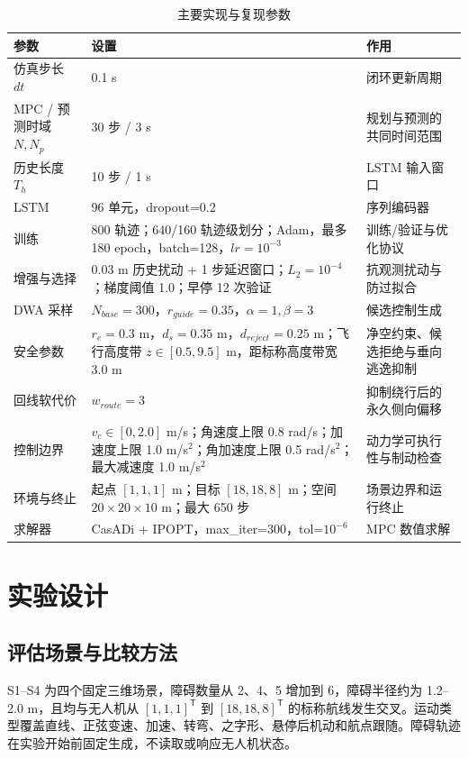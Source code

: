 \documentclass[11pt,a4paper]{ctexart}
\begin{document}
\begin{table}[t]
\centering
\small
\caption{主要实现与复现参数}
\label{tab:table-1}
\begin{tabularx}{\linewidth}{YYY}
\toprule
参数 & 设置 & 作用 \\
\midrule
仿真步长 $dt$ & 0.1 s & 闭环更新周期 \\
MPC / 预测时域 $N,N_p$ & 30 步 / 3 s & 规划与预测的共同时间范围 \\
历史长度 $T_h$ & 10 步 / 1 s & LSTM 输入窗口 \\
LSTM & 96 单元，dropout=0.2 & 序列编码器 \\
训练 & 800 轨迹；640/160 轨迹级划分；Adam，最多 180 epoch，batch=128，$lr=10^{-3}$ & 训练/验证与优化协议 \\
增强与选择 & 0.03 m 历史扰动 + 1 步延迟窗口；$L_2=10^{-4}$；梯度阈值 1.0；早停 12 次验证 & 抗观测扰动与防过拟合 \\
DWA 采样 & $N_{base}=300$，$r_{guide}=0.35$，$\alpha=1,\beta=3$ & 候选控制生成 \\
安全参数 & $r_e=0.3$ m，$d_s=0.35$ m，$d_{reject}=0.25$ m；飞行高度带 $z\in[0.5,9.5]$ m，距标称高度带宽 3.0 m & 净空约束、候选拒绝与垂向逃逸抑制 \\
回线软代价 & $w_{route}=3$ & 抑制绕行后的永久侧向偏移 \\
控制边界 & $v_c\in[0,2.0]$ m/s；角速度上限 0.8 rad/s；加速度上限 1.0 m/s$^2$；角加速度上限 0.5 rad/s$^2$；最大减速度 1.0 m/s$^2$ & 动力学可执行性与制动检查 \\
环境与终止 & 起点 $[1,1,1]$ m；目标 $[18,18,8]$ m；空间 $20\times20\times10$ m；最大 650 步 & 场景边界和运行终止 \\
求解器 & CasADi + IPOPT，max\_iter=300，tol=$10^{-6}$ & MPC 数值求解 \\
\bottomrule
\end{tabularx}
\end{table}

\section{实验设计}

\subsection{评估场景与比较方法}

S1–S4 为四个固定三维场景，障碍数量从 2、4、5 增加到 6，障碍半径约为 1.2–2.0 m，且均与无人机从 $[1,1,1]^\mathsf{T}$ 到 $[18,18,8]^\mathsf{T}$ 的标称航线发生交叉。运动类型覆盖直线、正弦变速、加速、转弯、之字形、悬停后机动和航点跟随。障碍轨迹在实验开始前固定生成，不读取或响应无人机状态。
\end{document}
